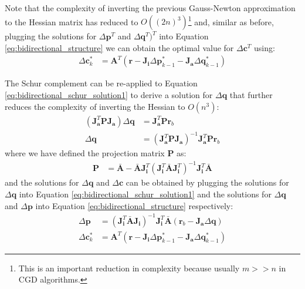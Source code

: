 Note that the complexity of inverting the previous Gauss-Newton approximation to the Hessian matrix has reduced to $O((2n)^3)$\footnote{This is an important reduction in complexity because usually $m >> n$ in CGD algorithms.} and, similar as before, plugging the solutions for $\Delta\mathbf{p}^T $ and $\Delta\mathbf{q}^T)^T$ into Equation \ref{eq:bidirectional_structure} we can obtain the optimal value for $\Delta\mathbf{c}^T$ using:
\begin{equation}
    \begin{aligned}
        \Delta\mathbf{c}^*_k & = \mathbf{A}^T \left( \mathbf{r} - \mathbf{J}_{\mathbf{i}} \Delta\mathbf{p}^*_{k-1} - \mathbf{J}_{\mathbf{a}} \Delta\mathbf{q}^*_{k-1} \right) 
    \label{eq:bidirectional_schur_solution2}
    \end{aligned}
\end{equation}

The Schur complement can be re-applied to Equation \ref{eq:bidirectional_schur_solution1} to derive a solution for $\Delta\mathbf{q}$ that further reduces the complexity of inverting the Hessian to $O(n^3)$:
\begin{equation}
    \begin{aligned}
        \left( \mathbf{J}_{\mathbf{a}}^T\mathbf{P}\mathbf{J}_{\mathbf{a}} \right) \Delta \mathbf{q} & = \mathbf{J}_{\mathbf{a}}^T\mathbf{P}\mathbf{r}_b
        \\
        \Delta \mathbf{q} & = \left( \mathbf{J}_{\mathbf{a}}^T\mathbf{P}\mathbf{J}_{\mathbf{a}} \right)^{-1} \mathbf{J}_{\mathbf{a}}^T\mathbf{P}\mathbf{r}_b
    \label{eq:bidirectional_schur_solution3}
    \end{aligned}
\end{equation}
where we have defined the projection matrix $\mathbf{P}$ as:
\begin{equation}
    \begin{aligned}
		\mathbf{P} &= \bar{\mathbf{A}} - \bar{\mathbf{A}}\mathbf{J}_{\mathbf{i}}^T \left( \mathbf{J}_{\mathbf{i}}^T\bar{\mathbf{A}}\mathbf{J}_{\mathbf{i}}^T \right)^{-1} \mathbf{J}_{\mathbf{i}}^T\bar{\mathbf{A}}
		\label{eq:bidirectional_schur_projection}
    \end{aligned}
\end{equation}
and the solutions for $\Delta\mathbf{q}$ and $\Delta\mathbf{c}$ can be obtained by plugging the solutions for $\Delta\mathbf{q}$ into Equation \ref{eq:bidirectional_schur_solution1} and the solutions for $\Delta\mathbf{q}$ and $\Delta\mathbf{p}$ into Equation \ref{eq:bidirectional_structure} respectively:
\begin{equation}
    \begin{aligned}
        \Delta \mathbf{p} & = \left( \mathbf{J}_{\mathbf{i}}^T\bar{\mathbf{A}}\mathbf{J}_{\mathbf{i}} \right)^{-1} \mathbf{J}_{\mathbf{i}}^T\bar{\mathbf{A}} \left(\mathbf{r}_b - \mathbf{J}_{\mathbf{a}}\Delta \mathbf{q} \right)
        \\
        \Delta\mathbf{c}^*_k & = \mathbf{A}^T \left( \mathbf{r} - \mathbf{J}_{\mathbf{i}} \Delta\mathbf{p}^*_{k-1} - \mathbf{J}_{\mathbf{a}} \Delta\mathbf{q}^*_{k-1} \right) 
    \label{eq:bidirectional_schur_solution4}
    \end{aligned}
\end{equation}

